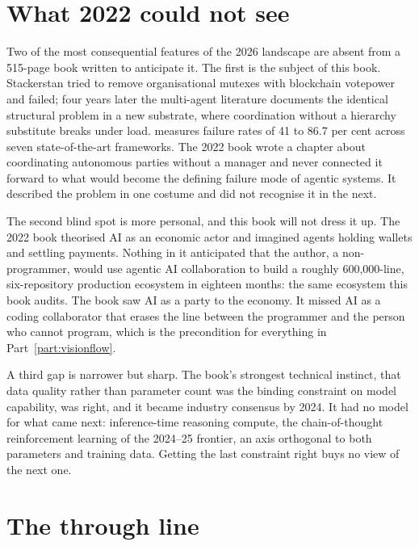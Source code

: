 \section{What 2022 could not see}

Two of the most consequential features of the 2026 landscape are absent from a 515-page book written to anticipate it. The first is the subject of this book. Stackerstan tried to remove organisational mutexes with blockchain votepower and failed; four years later the multi-agent literature documents the identical structural problem in a new substrate, where coordination without a hierarchy substitute breaks under load. \textcite{Cemri2025} measures failure rates of 41 to 86.7 per cent across seven state-of-the-art frameworks. The 2022 book wrote a chapter about coordinating autonomous parties without a manager and never connected it forward to what would become the defining failure mode of agentic systems. It described the problem in one costume and did not recognise it in the next.

The second blind spot is more personal, and this book will not dress it up. The 2022 book theorised AI as an economic actor and imagined agents holding wallets and settling payments. Nothing in it anticipated that the author, a non-programmer, would use agentic AI collaboration to build a roughly 600,000-line, six-repository production ecosystem in eighteen months: the same ecosystem this book audits. The book saw AI as a party to the economy. It missed AI as a coding collaborator that erases the line between the programmer and the person who cannot program, which is the precondition for everything in Part~\ref{part:visionflow}.

A third gap is narrower but sharp. The book's strongest technical instinct, that data quality rather than parameter count was the binding constraint on model capability, was right, and it became industry consensus by 2024. It had no model for what came next: inference-time reasoning compute, the chain-of-thought reinforcement learning of the 2024--25 frontier, an axis orthogonal to both parameters and training data. Getting the last constraint right buys no view of the next one.

\section{The through line}

